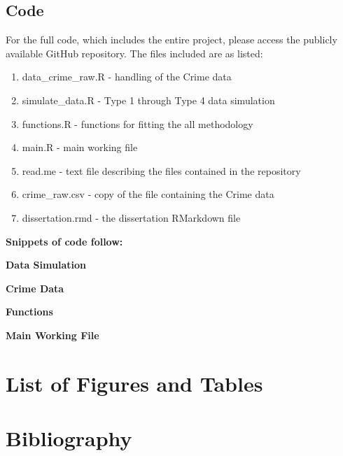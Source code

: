 \documentclass[
  11pt,
]{article}
\providecommand{\tightlist}{%
  \setlength{\itemsep}{0pt}\setlength{\parskip}{0pt}}
\begin{document}
\subsection{Code}

For the full code, which includes the entire project, please access the
publicly available GitHub repository. The files included are as listed:

\begin{enumerate}
\def\labelenumi{\arabic{enumi}.}
\tightlist
\item
  data\_crime\_raw.R - handling of the Crime data
\item
  simulate\_data.R - Type 1 through Type 4 data simulation
\item
  functions.R - functions for fitting the all methodology
\item
  main.R - main working file
\item
  read.me - text file describing the files contained in the repository
\item
  crime\_raw.csv - copy of the file containing the Crime data
\item
  dissertation.rmd - the dissertation RMarkdown file
\end{enumerate}

\textbf{Snippets of code follow:}

\textbf{Data Simulation}

\textbf{Crime Data}

\textbf{Functions}

\textbf{Main Working File}

\section{List of Figures and Tables}

\listoffigures
  \listoftables

\section{Bibliography}
\end{document}
